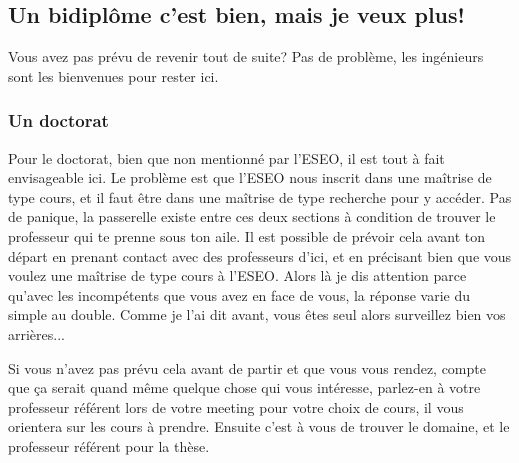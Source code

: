 \subsection{Un bidiplôme c’est bien, mais je veux plus!}\label{sec:sec4.7.2}

Vous avez pas prévu de revenir tout de suite? Pas de problème, les ingénieurs sont les bienvenues pour rester ici.

\subsubsection{Un doctorat}\label{sec:sec4.7.2.1}
Pour le doctorat, bien que non mentionné par l’ESEO, il est tout à fait envisageable ici. Le problème est que l’ESEO nous inscrit dans une maîtrise de type cours, et il faut être dans une maîtrise de type recherche pour y accéder.
Pas de panique, la passerelle existe entre ces deux sections à condition de trouver le professeur qui te prenne sous ton aile.
Il est possible de prévoir cela avant ton départ en prenant contact avec des professeurs d’ici, et en précisant bien que vous voulez une maîtrise de type cours à l’ESEO. Alors là je dis attention parce qu’avec les incompétents que vous avez en face de vous, la réponse varie du simple au double. Comme je l’ai dit avant, vous êtes seul alors surveillez bien vos arrières...

Si vous n’avez pas prévu cela avant de partir et que vous vous rendez, compte que ça serait quand même quelque chose qui vous intéresse, parlez-en à votre professeur référent lors de votre meeting pour votre choix de cours, il vous orientera sur les cours à prendre. Ensuite c’est à vous de trouver le domaine, et le professeur référent pour la thèse.

